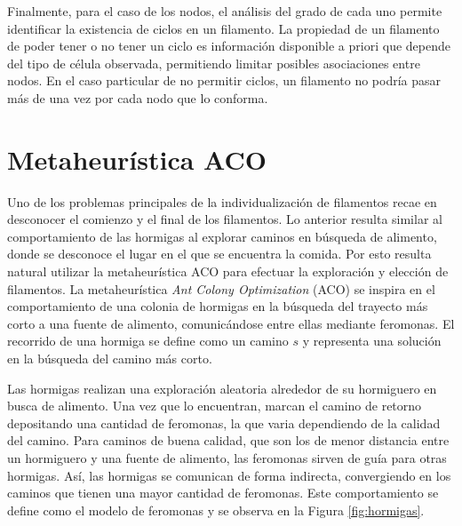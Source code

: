Finalmente, para el caso de los nodos, el an\'alisis del grado de cada uno permite identificar la existencia de ciclos \cite{wilson1979introduction} en un filamento. La propiedad de un filamento de poder tener o no tener un ciclo es informaci\'on disponible a priori que depende del tipo de c\'elula observada, permitiendo limitar posibles asociaciones entre nodos. En el caso particular de no permitir ciclos, un filamento no podr\'ia pasar m\'as de una vez por cada nodo que lo conforma. 

\section{Metaheur\'istica ACO}
\label{sec:hormigas}

Uno de los problemas principales de la individualizaci\'on de filamentos recae en desconocer el comienzo y el final de los filamentos. Lo anterior resulta similar al comportamiento de las hormigas al explorar caminos en b\'usqueda de alimento, donde se desconoce el lugar en el que se encuentra la comida. Por esto resulta natural utilizar la metaheur\'istica ACO para efectuar la exploraci\'on y elecci\'on de filamentos. La metaheur\'istica {\it Ant Colony Optimization} (ACO) se inspira en el comportamiento de una colonia de hormigas en la b\'usqueda del trayecto m\'as corto a una fuente de alimento, comunic\'andose entre ellas mediante feromonas. El recorrido de una hormiga se define como un camino $s$ y representa una soluci\'on en la b\'usqueda del camino m\'as corto.

Las hormigas realizan una exploraci\'on aleatoria alrededor de su hormiguero en busca de alimento. Una vez que lo encuentran, marcan el camino de retorno depositando una cantidad de feromonas, la que varia dependiendo de la calidad del camino. Para caminos de buena calidad, que son los de menor distancia entre un hormiguero y una fuente de alimento, las feromonas sirven de guía para otras hormigas. As\'i, las hormigas se comunican de forma indirecta, convergiendo en los caminos que tienen una mayor cantidad de feromonas. Este comportamiento se define como el modelo de feromonas y se observa en la Figura \ref{fig:hormigas}.


